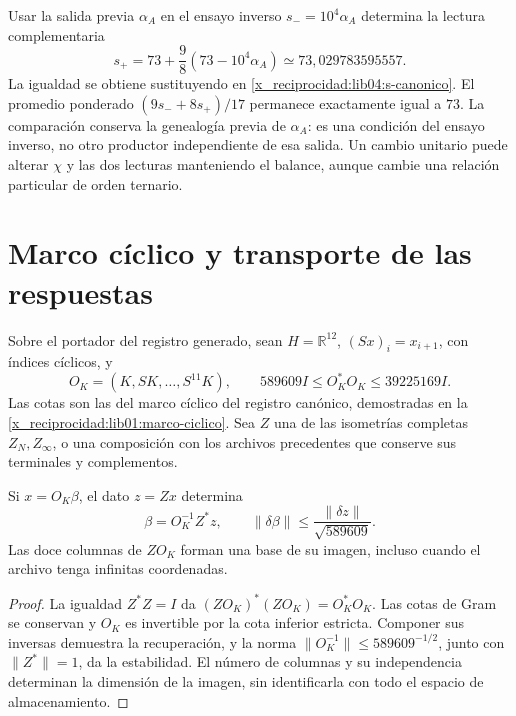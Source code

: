 Usar la salida previa \(\alpha_A\) en el ensayo inverso
\(s_-=10^4\alpha_A\) determina la lectura complementaria
\begin{equation}
 s_+=73+\frac98(73-10^4\alpha_A)
       \simeq73{,}029783595557.
 \label{x_reciprocidad:lib04:ensayo-alpha}
\end{equation}
La igualdad se obtiene sustituyendo en
\eqref{x_reciprocidad:lib04:s-canonico}. El promedio ponderado
\((9s_-+8s_+)/17\) permanece exactamente igual a \(73\).
La comparación conserva la genealogía previa de \(\alpha_A\): es
una condición del ensayo inverso, no otro productor independiente de
esa salida. Un cambio unitario puede alterar \(\chi\) y las dos
lecturas manteniendo el balance, aunque cambie una relación particular
de orden ternario.

\section{Marco cíclico y transporte de las respuestas}
\label{x_reciprocidad:lib04:marco}

Sobre el portador del registro generado, sean
\(H=\mathbb R^{12}\), \((Sx)_i=x_{i+1}\), con índices cíclicos,
y
\begin{equation}
 O_K=(K,SK,\ldots,S^{11}K),\qquad
 589609I\leq O_K^*O_K\leq39225169I.
 \label{x_reciprocidad:lib04:gram-k}
\end{equation}
Las cotas son las del marco cíclico del registro canónico,
demostradas en la \cref{x_reciprocidad:lib01:marco-ciclico}.
Sea \(Z\) una de las isometrías completas
\(Z_N,Z_\infty\), o una composición con los archivos precedentes
que conserve sus terminales y complementos.

\begin{theorem}
\label{x_reciprocidad:lib04:teo-marco}
Si \(x=O_K\beta\), el dato \(z=Zx\) determina
\begin{equation}
 \beta=O_K^{-1}Z^*z,\qquad
 \|\delta\beta\|\leq\frac{\|\delta z\|}{\sqrt{589609}}.
 \label{x_reciprocidad:lib04:inversa-marco}
\end{equation}
Las doce columnas de \(ZO_K\) forman una base de su imagen, incluso
cuando el archivo tenga infinitas coordenadas.
\end{theorem}

\begin{proof}
La igualdad \(Z^*Z=I\) da
\((ZO_K)^*(ZO_K)=O_K^*O_K\). Las cotas de Gram se conservan y
\(O_K\) es invertible por la cota inferior estricta. Componer sus
inversas demuestra la recuperación, y la norma
\(\|O_K^{-1}\|\leq589609^{-1/2}\), junto con
\(\|Z^*\|=1\), da la estabilidad. El número de columnas y su
independencia determinan la dimensión de la imagen, sin identificarla
con todo el espacio de almacenamiento.
\end{proof}

